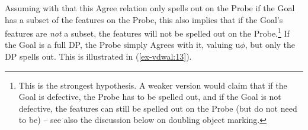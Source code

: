 \documentclass[output=paper
,modfonts
,nonflat]{langsci/langscibook}
\begin{document}
\begin{exe}
	\ex \label{ex-vdwal:12}
	\xlist
	\endxlist
\end{exe} 
\noindent Assuming with \citet{Roberts2010} that this Agree relation only spells out on the Probe if the Goal has a subset of the features on the Probe, this also implies that if the Goal’s features are \textit{not} a subset, the features will not be spelled out on the Probe.\footnote{This is the strongest hypothesis. A weaker version would claim that if the Goal is defective, the Probe has to be spelled out, and if the Goal is not defective, the features can still be spelled out on the Probe (but do not need to be) – see also the discussion below on doubling object marking.} If the Goal is a full DP, the Probe simply Agrees with it, valuing u$\phi$, but only the DP spells out. This is illustrated in (\ref{ex-vdwal:13}).
\end{document}
